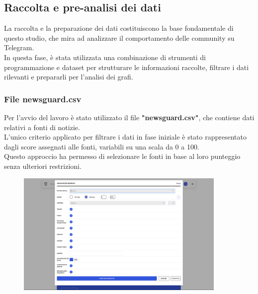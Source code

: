 \documentclass[12pt]{article}
\begin{document}
	\subsection{Raccolta e pre-analisi dei dati}
	La raccolta e la preparazione dei dati costituiscono la base fondamentale di questo studio, che mira ad analizzare il comportamento delle community su Telegram.\\
	In questa fase, è stata utilizzata una combinazione di strumenti di programmazione e dataset per strutturare le informazioni raccolte, filtrare i dati rilevanti e prepararli per l'analisi dei grafi.
	\subsubsection{File newsguard.csv}
	Per l'avvio del lavoro è stato utilizzato il file \textbf{"newsguard.csv"}, che contiene dati relativi a fonti di notizie.\\
	L'unico criterio applicato per filtrare i dati in fase iniziale è stato rappresentato dagli score assegnati alle fonti, variabili su una scala da 0 a 100.\\
	Questo approccio ha permesso di selezionare le fonti in base al loro punteggio senza ulteriori restrizioni.
	\begin{figure}[H]
		\centering
		\includegraphics[width=0.9\textwidth]{immagini/filtro.png}
	\end{figure}
\end{document}

